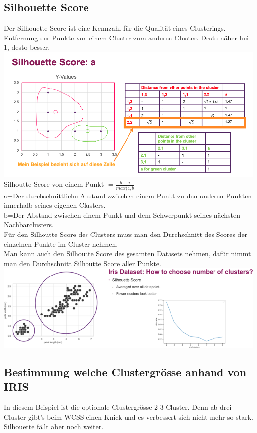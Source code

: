 \subsection{Silhouette Score}
Der Silhouette Score ist eine Kennzahl für die Qualität eines Clusterings. Entfernung der Punkte von einem Cluster zum anderen Cluster. Desto näher bei 1, desto besser.\\
\includegraphics[width=\linewidth]{img/silhoutte_score_calculation.png}
Silhoutte Score von einem Punkt $= \frac{b-a}{max(a,b}$\\
a=Der durchschnittliche Abstand zwischen einem Punkt zu den anderen Punkten innerhalb seines eigenen Clusters.\\
b=Der Abstand zwischen einem Punkt und dem Schwerpunkt seines nächsten Nachbarclusters.\\
Für den Silhoutte Score des Clusters muss man den Durchschnitt des Scores der einzelnen Punkte im Cluster nehmen. \\
Man kann auch den Silhoutte Score des gesamten Datasets nehmen, dafür nimmt man den Durchschnitt Silhoutte Score aller Punkte. 
\includegraphics[width=\linewidth]{img/silhoutte_score.png}
\subsection{Bestimmung welche Clustergrösse anhand von IRIS}
In diesem Beispiel ist die optionale Clustergrösse 2-3 Cluster. Denn ab drei Cluster gibt’s beim WCSS einen Knick und es verbessert sich nicht mehr so stark. Silhouette fällt aber noch weiter.
